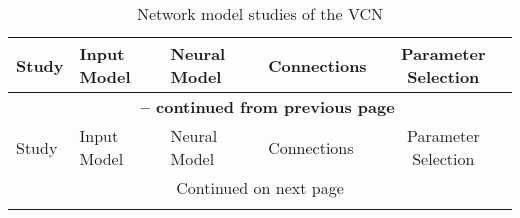 \begin{longtable}{XXXXc}%
%
\caption{Network model studies of the VCN}\label{tab:ModellingCNTable} \\
\toprule  
                           Study                             &                     Input Model                      &                          Neural Model                          &                    Connections                     & Parameter Selection      %
\\ \midrule
\endfirsthead

\multicolumn{5}{c}{{\bfseries \tablename\ \thetable{} -- continued from previous page}} \\
                      \midrule  Study                        &                     Input Model                      &                          Neural Model                          &                    Connections                     & Parameter Selection     %
\\ \midrule
\endhead

\midrule \multicolumn{5}{c}{{Continued on next page}} \\ %
\endfoot
\bottomrule
\endlastfoot




\end{longtable}
